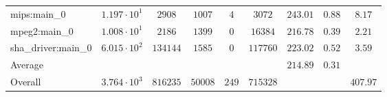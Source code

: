 \begin{tabular}{|l|c|c|c|c|c|c|c|c|}
mips:main\_0            & $ 1.197 \cdot 10^{1}  $ & $ 2908   $ & $ 1007  $ & $ 4   $ & $ 3072   $ & $ 243.01      $ & $ 0.88    $ & $ 8.17    $ \\
mpeg2:main\_0           & $ 1.008 \cdot 10^{1}  $ & $ 2186   $ & $ 1399  $ & $ 0   $ & $ 16384  $ & $ 216.78      $ & $ 0.39    $ & $ 2.21    $ \\
sha\_driver:main\_0     & $ 6.015 \cdot 10^{2}  $ & $ 134144 $ & $ 1585  $ & $ 0   $ & $ 117760 $ & $ 223.02      $ & $ 0.52    $ & $ 3.59    $ \\
\hline
Average                 & $                     $ & $        $ & $       $ & $     $ & $        $ & $ 214.89      $ & $ 0.31    $ & $         $ \\
\hline
Overall                 & $ 3.764 \cdot 10^{3}  $ & $ 816235 $ & $ 50008 $ & $ 249 $ & $ 715328 $ & $             $ & $         $ & $ 407.97  $ \\
\hline
\end{tabular}
